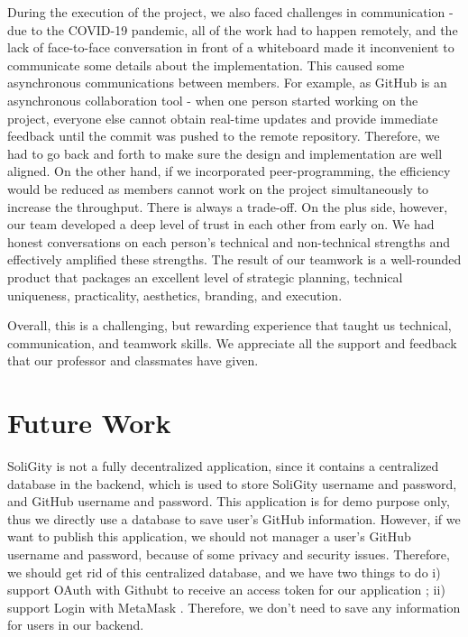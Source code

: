 \documentclass[12pt]{article}
\renewcommand{\_}{\kern-1.5pt\textunderscore\kern-1.5pt}
\begin{document}
During the execution of the project, we also faced challenges in communication - due to the COVID-19 pandemic,
all of the work had to happen remotely, and the lack of face-to-face conversation in front of a whiteboard made
it inconvenient to communicate some details about the implementation. This caused some asynchronous communications
between members. For example, as GitHub is an asynchronous collaboration tool - when one person started working
on the project, everyone else cannot obtain real-time updates and provide immediate feedback until the commit
was pushed to the remote repository. Therefore, we had to go back and forth to make sure the design and implementation
are well aligned. On the other hand, if we incorporated peer-programming, the efficiency would be reduced as
members cannot work on the project simultaneously to increase the throughput. There is always a trade-off. On
the plus side, however, our team developed a deep level of trust in each other from early on. We had honest
conversations on each person's technical and non-technical strengths and effectively amplified these strengths.
The result of our teamwork is a well-rounded product that packages an excellent level of strategic planning,
technical uniqueness, practicality, aesthetics, branding, and execution.

Overall, this is a challenging, but rewarding experience that taught us technical, communication, and teamwork
skills. We appreciate all the support and feedback that our professor and classmates have given.

\section{Future Work}

SoliGity is not a fully decentralized application, since it contains a centralized database in the backend, which
is used to store SoliGity username and password, and GitHub username and password. This application is for demo
purpose only, thus we directly use a database to save user's GitHub information. However, if we want to publish
this application, we should not manager a user's GitHub username and password, because of some privacy and security
issues. Therefore, we should get rid of this centralized database, and we have two things to do i) support OAuth
with Githubt to receive an access token for our application \cite{github_developer}; ii) support Login with MetaMask
\cite{martiny_2018}. Therefore, we don't need to save any information for users in our backend.
\end{document}
